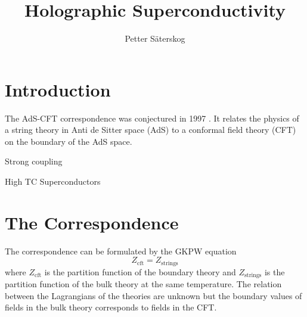 \documentclass[12pt]{book}
\title{Holographic Superconductivity}
\author{Petter Säterskog}
\begin{document}
\maketitle
\tableofcontents

\section{Introduction}
The AdS-CFT correspondence was conjectured in 1997 \cite{Maldacena:1997re}. It relates the physics of a string theory in Anti de Sitter space (AdS) to a conformal field theory (CFT) on the boundary of the AdS space.

Strong coupling

High TC Superconductors
\section{The Correspondence}
The correspondence can be formulated by the GKPW equation \cite{Witten:1998qj}
\begin{equation}
 Z_{\text{cft}}=Z_{\text{strings}}
\label{GKPW}
\end{equation}
where $Z_{\text{cft}}$ is the partition function of the boundary theory and $Z_{\text{strings}}$ is the partition function of the bulk theory at the same temperature. The relation between the Lagrangians of the theories are unknown but the boundary values of fields in the bulk theory corresponds to fields in the CFT.
\end{document}
